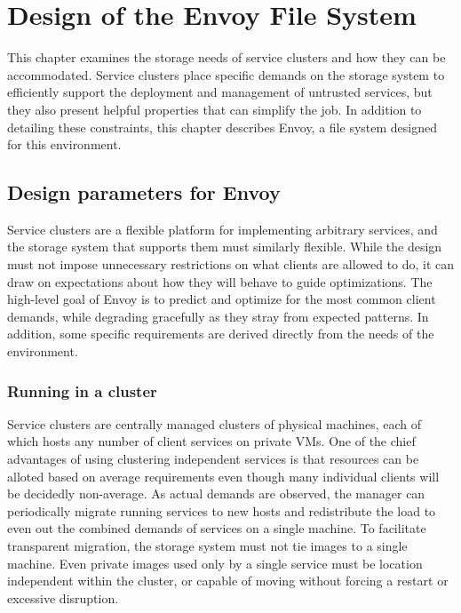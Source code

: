 \chapter{Design of the Envoy File System}

This chapter examines the storage needs of service clusters and how they can be accommodated. Service clusters place specific demands on the storage system to efficiently support the deployment and management of untrusted services, but they also present helpful properties that can simplify the job. In addition to detailing these constraints, this chapter describes Envoy, a file system designed for this environment.

\section{Design parameters for Envoy}

Service clusters are a flexible platform for implementing arbitrary services, and the storage system that supports them must similarly flexible. While the design must not impose unnecessary restrictions on what clients are allowed to do, it can draw on expectations about how they will behave to guide optimizations. The high-level goal of Envoy is to predict and optimize for the most common client demands, while degrading gracefully as they stray from expected patterns. In addition, some specific requirements are derived directly from the needs of the environment.

\subsection{Running in a cluster}

Service clusters are centrally managed clusters of physical machines, each of which hosts any number of client services on private VMs. One of the chief advantages of using clustering independent services is that resources can be alloted based on average requirements even though many individual clients will be decidedly non-average. As actual demands are observed, the manager can periodically migrate running services to new hosts and redistribute the load to even out the combined demands of services on a single machine. To facilitate transparent migration, the storage system must not tie images to a single machine. Even private images used only by a single service must be location independent within the cluster, or capable of moving without forcing a restart or excessive disruption.


